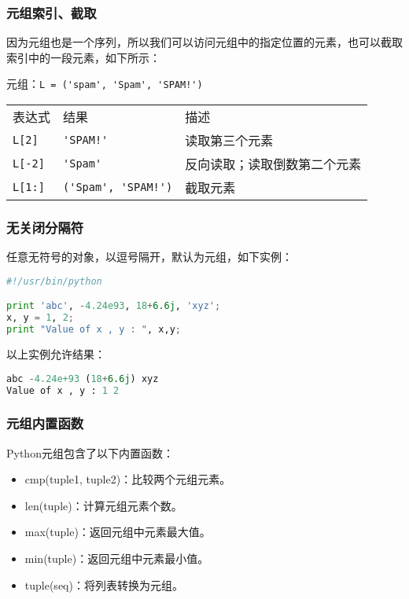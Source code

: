 \subsubsection{元组索引、截取}
因为元组也是一个序列，所以我们可以访问元组中的指定位置的元素，也可以截取索引中的一段元素，如下所示：

元组：\verb|L = ('spam', 'Spam', 'SPAM!')|

\begin{tabular}{l|l|l}
 表达式 & 	结果&	描述\\
\verb|L[2]| &	\verb|'SPAM!'| &	读取第三个元素\\
\verb|L[-2]| &	\verb|'Spam'|	 &反向读取；读取倒数第二个元素\\
\verb|L[1:]| &	\verb|('Spam', 'SPAM!')| &	截取元素
\end{tabular}


\subsubsection{无关闭分隔符}
任意无符号的对象，以逗号隔开，默认为元组，如下实例：
\begin{lstlisting}[language=Python]
#!/usr/bin/python

print 'abc', -4.24e93, 18+6.6j, 'xyz';
x, y = 1, 2;
print "Value of x , y : ", x,y;
\end{lstlisting}
以上实例允许结果：
\begin{lstlisting}[language=Python]
abc -4.24e+93 (18+6.6j) xyz
Value of x , y : 1 2
\end{lstlisting}


\subsubsection{元组内置函数}
Python元组包含了以下内置函数：
\begin{itemize}
\item 	cmp(tuple1, tuple2)：比较两个元组元素。
\item	len(tuple)：计算元组元素个数。
\item	max(tuple)：返回元组中元素最大值。
\item	min(tuple)：返回元组中元素最小值。
\item	tuple(seq)：将列表转换为元组。
\end{itemize}


